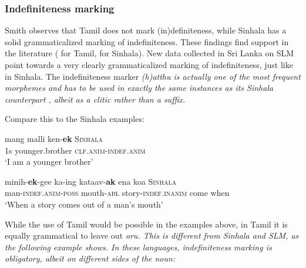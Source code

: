 \documentclass[a4paper,10pt]{article}
\newcommand{\T}{\tz}
\begin{document}
\subsubsection{Indefiniteness marking}
Smith observes that Tamil does not mark (in)definiteness, while Sinhala has a solid grammaticalized marking of indefiniteness. These findings find support in the literature (\citet{Asher1985,Lehmann1989tamil} for Tamil, \citet{GairEtAl1997,Gair2003,Karunatillake2004} for Sinhala). New data collected in Sri Lanka on SLM point towards a very clearly grammaticalized marking of indefiniteness, just like in Sinhala. The indefiniteness marker \em (h)atthu \em is actually one of the most frequent morphemes and has to be used in exactly the same instances as its Sinhala counterpart \citep[319-323]{Nordhoff2009phd}, albeit as a clitic rather than a suffix.



Compare this to the Sinhala examples:

\ea
\gll mang malli ken-\textbf{ek}   \textsc{Sinhala} \\
     1s younger.brother \textsc{clf.anim}-\textsc{indef.anim} \\
`I am a younger brother' 
\z

\ea
\gll  minih-\textbf{ek}-gee ka\T{}-ing kataav-\textbf{ak}  ena ko\T{}a   \textsc{Sinhala} \\
      man-\textsc{indef.anim}-\textsc{poss} mouth-\textsc{abl} story-\textsc{indef.inanim} come when \\
`When a story comes out of a man's mouth' 
\z

While the use of Tamil  would be possible in the examples above, in Tamil it is equally grammatical to leave out \em oru\em. This is different from Sinhala and SLM, as the following example shows. In these languages, indefiniteness marking is obligatory, albeit on different sides of the noun:
\end{document}
